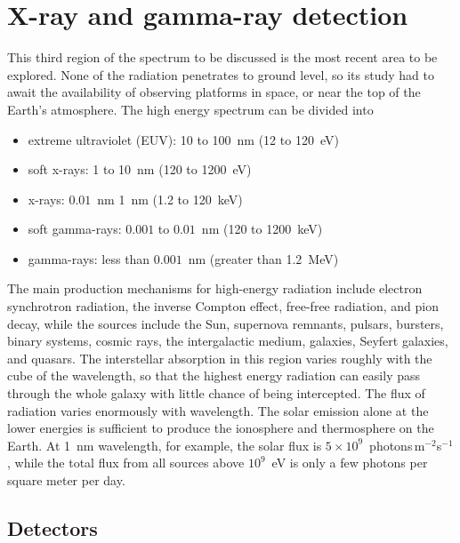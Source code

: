 \section{X-ray and gamma-ray detection}

This third region of the spectrum to be discussed is the most recent area
to be explored. None of the radiation penetrates to ground level, so its
study had to await the availability of observing platforms in space, or near
the top of the Earth's atmosphere. The high energy spectrum can be divided into
\begin{itemize}
\item extreme ultraviolet (EUV): 10 to 100~nm (12 to 120~eV)
\item soft x-rays: 1 to 10~nm (120 to 1200~eV)
\item x-rays: $0.01$~nm 1~nm (1.2 to 120~keV)
\item soft gamma-rays: $0.001$ to $0.01$~nm (120 to 1200~keV)
\item gamma-rays: less than $0.001$~nm (greater than 1.2~MeV)
\end{itemize}

The main production mechanisms for high-energy radiation include electron
synchrotron radiation, the inverse Compton effect, free-free radiation, 
and pion decay, while the sources include the Sun, supernova remnants, pulsars,
bursters, binary systems, cosmic rays, the intergalactic medium, galaxies,
Seyfert galaxies, and quasars. The interstellar absorption in this region
varies roughly with the cube of the wavelength, so that the highest 
energy radiation can easily pass through the whole galaxy with little 
chance of being intercepted. The flux of radiation varies enormously
with wavelength. The solar emission alone at the lower energies is 
sufficient to produce the ionosphere and thermosphere on the Earth. At 
1~nm wavelength, for example, the solar flux is 
$5\times 10^9$~photons$\,$m$^{-2}$s$^{-1}$, while the total flux from all sources
above $10^9$~eV is only a few photons per square meter per day.

\subsection{Detectors}

